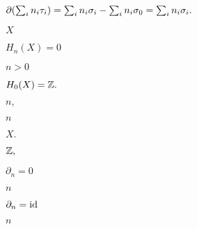 \documentclass[10pt]{book}
\begin{document}
\begin{mdSnippets}
\begin{mdInlineSnippet}
$\partial\qty(\sum_i n_i \tau_i) = \sum_i n_i \sigma_i - \sum_i n_i \sigma_0 = \sum_i n_i \sigma_i.$\end{mdInlineSnippet}%
\begin{mdInlineSnippet}[02129bb861061d1a052c592e2dc6b383]%
$X$\end{mdInlineSnippet}%
\begin{mdInlineSnippet}[51d982d78a4b9ba6cb9ff7fc77977ff0]%
$H_n(X) = 0$\end{mdInlineSnippet}%
\begin{mdInlineSnippet}[de41f86e42a74b61a37b3a76b7f5edfb]%
$n > 0$\end{mdInlineSnippet}%
\begin{mdInlineSnippet}[a4d924076645a1dd54c433135ab4033c]%
$H_0(X) = \mathbb{Z}.$\end{mdInlineSnippet}%
\begin{mdInlineSnippet}[1a58f249932a2915e61842f01ae0feca]%
$n,$\end{mdInlineSnippet}%
\begin{mdInlineSnippet}[7b8b965ad4bca0e41ab51de7b31363a1]%
$n$\end{mdInlineSnippet}%
\begin{mdInlineSnippet}[3d2f9e254afe4be361f104d3748e8570]%
$X.$\end{mdInlineSnippet}%
\begin{mdInlineSnippet}[23a6a367446985b3204af24ebfc3841c]%
$\mathbb{Z},$\end{mdInlineSnippet}%
\begin{mdInlineSnippet}[930ad16209e8bdb4500e74f977f05579]%
$\partial_n = 0$\end{mdInlineSnippet}%
\begin{mdInlineSnippet}[7b8b965ad4bca0e41ab51de7b31363a1]%
$n$\end{mdInlineSnippet}%
\begin{mdInlineSnippet}[a7c520a2b972cb7aed6352a0b434a556]%
$\partial_n = \operatorname{id}$\end{mdInlineSnippet}%
\begin{mdInlineSnippet}[7b8b965ad4bca0e41ab51de7b31363a1]%
$n$\end{mdInlineSnippet}%
\begin{mdInlineSnippet}[265a73054d77b3d99fcab570fd7e6a28]%

\end{mdInlineSnippet}
\end{mdSnippets}
\end{document}
